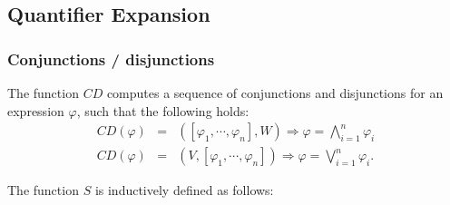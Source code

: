 \newpage

\subsection{Quantifier Expansion}

\subsubsection{Conjunctions / disjunctions}

The function $CD$ computes a sequence of conjunctions and disjunctions for
an expression $\varphi $, such that the following holds:%
\begin{eqnarray*}
CD\left( \varphi \right) &=&\left( \left[ \varphi _{1},\cdots ,\varphi _{n}%
\right] ,W\right) \Rightarrow \varphi =\bigwedge\limits_{i=1}^{n}\varphi _{i}
\\
CD\left( \varphi \right) &=&\left( V,\left[ \varphi _{1},\cdots ,\varphi _{n}%
\right] \right) \Rightarrow \varphi =\bigvee\limits_{i=1}^{n}\varphi _{i}.
\end{eqnarray*}

The function $S$ is inductively defined as follows:

